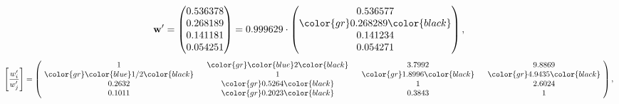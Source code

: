\begin{example}
\begin{equation*}
\mathbf{w}^{\prime} =
\begin{pmatrix}
0.536378\\
0.268189\\
0.141181\\
0.054251
\end{pmatrix} =
0.999629\cdot
\begin{pmatrix}
0.536577\\
\color{gr} 0.268289\color{black} \\
0.141234\\
0.054271
\end{pmatrix},
\end{equation*}
\begin{equation*}
\left[ \frac{{w}^{\prime}_i}{{w}^{\prime}_j} \right] =
\begin{pmatrix}
$\,\,$ 1 $\,\,$ & $\,\,$\color{gr} \color{blue} 2\color{black} $\,\,$ & $\,\,$3.7992$\,\,$ & $\,\,$9.8869$\,\,$ \\
$\,\,$\color{gr} \color{blue}  1/2\color{black} $\,\,$ & $\,\,$ 1 $\,\,$ & $\,\,$\color{gr} 1.8996\color{black} $\,\,$ & $\,\,$\color{gr} 4.9435\color{black}   $\,\,$ \\
$\,\,$0.2632$\,\,$ & $\,\,$\color{gr} 0.5264\color{black} $\,\,$ & $\,\,$ 1 $\,\,$ & $\,\,$2.6024 $\,\,$ \\
$\,\,$0.1011$\,\,$ & $\,\,$\color{gr} 0.2023\color{black} $\,\,$ & $\,\,$0.3843$\,\,$ & $\,\,$ 1  $\,\,$ \\
\end{pmatrix},
\end{equation*}
\end{example}
\newpage
